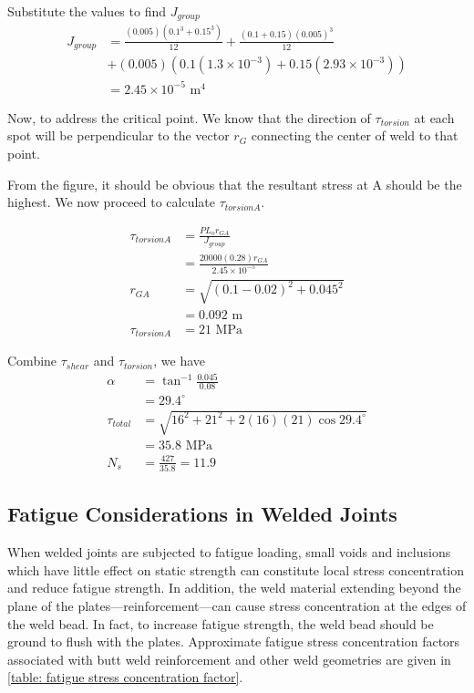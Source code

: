 \documentclass[a4paper,openany,nobib]{tufte-book}
\begin{document}
{{Substitute the values to find \(J_{group}\) $$\begin{aligned}
    J_{group} &= \frac{(0.005)(0.1^3 + 0.15^3)}{12} +\frac{(0.1 + 0.15)(0.005)^3}{12} \\
              &+ (0.005)(0.1(1.3 \times 10^{-3}) + 0.15(2.93 \times 10^{-3})) \\
              &= 2.45 \times 10^{-5} \text{ m}^4
  \end{aligned}$$

Now, to address the critical point. We know that the direction of
\(\tau_{torsion}\) at each spot will be perpendicular to the vector \(r_G\)
connecting the center of weld to that point.

From the figure, it should be obvious that the resultant stress at A
should be the highest. We now proceed to calculate \(\tau_{torsionA}\).

$$\begin{aligned}
    \tau_{torsionA} &= \frac{P L_o r_{GA}}{J_{group}} \\
                    &=\frac{20000(0.28) r_{GA}}{2.45 \times 10^{-5}} \\[1em]
    r_{GA} &= \sqrt{(0.1 - 0.02)^2 + 0.045^2} \\
                    &= 0.092 \text{ m} \\[1em]
    \tau_{torsionA} &= 21 \text{ MPa}
  \end{aligned}$$

Combine \(\tau_{shear}\) and \(\tau_{torsion}\), we have $$\begin{aligned}
    \alpha &= \tan^{-1} \frac{0.045}{0.08} \\
           &= 29.4^{\circ} \\[1em]
    \tau_{total} &= \sqrt{ 16^2 + 21^2 + 2(16)(21) \cos 29.4^{\circ} } \\
           &= 35.8 \text{ MPa} \\[1em]
    N_s &= \frac{427}{35.8} = 11.9
  \end{aligned}$$

\subsection{Fatigue Considerations in Welded Joints}
\label{fatigue-considerations-in-welded-joints}
When welded joints are subjected to fatigue loading, small voids and
inclusions which have little effect on static strength can constitute
local stress concentration and reduce fatigue strength. In addition, the
weld material extending beyond the plane of the
plates---reinforcement---can cause stress concentration at the edges of
the weld bead. In fact, to increase fatigue strength, the weld bead
should be ground to flush with the plates. Approximate fatigue stress
concentration factors associated with butt weld reinforcement and other
weld geometries are given in
\ref{table: fatigue stress concentration factor}.


}}
\end{document}
